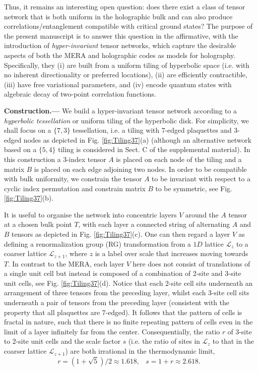\documentclass[aps,prl,twocolumn,showpacs,superscriptaddress,floatfix,10pt]{revtex4-1}
\def\L{{\mathcal L}}
\begin{document}
Thus, it remains an interesting open question: does there exist a class of tensor network that is both uniform in the holographic bulk and can also produce correlations/entanglement compatible with critical ground states? The purpose of the present manuscript is to answer this question in the affirmative, with the introduction of \emph{hyper-invariant} tensor networks, which capture the desirable aspects of both the MERA and holographic codes as models for holography. Specifically, they (i) are built from a uniform tiling of hyperbolic space (i.e. with no inherent directionality or preferred locations), (ii) are efficiently contractible, (iii) have free variational parameters, and (iv) encode quantum states with algebraic decay of two-point correlation functions. 

\textbf{Construction.---} We build a hyper-invariant tensor network according to a \emph{hyperbolic tessellation} or uniform tiling of the hyperbolic disk. For simplicity, we shall focus on a $\{7,3\}$ tessellation, i.e. a tiling with 7-edged plaquettes and 3-edged nodes as depicted in Fig. \ref{fig:Tiling37}(a) (although an alternative network based on a $\{5,4\}$ tiling is considered in Sect. C of the supplemental material). In this construction a 3-index tensor $A$ is placed on each node of the tiling and a matrix $B$ is placed on each edge adjoining two nodes. In order to be compatible with bulk uniformity, we constrain the tensor $A$ to be invariant with respect to a cyclic index permutation and constrain matrix $B$ to be symmetric, see Fig. \ref{fig:Tiling37}(b).

It is useful to organise the network into concentric layers $V$ around the $A$ tensor at a chosen bulk point $T$, with each layer a connected string of alternating $A$ and $B$ tensors as depicted in Fig. \ref{fig:Tiling37}(c). One can then regard a layer $V$ as defining a renormalization group (RG) transformation from a $1D$ lattice $\L_z$ to a coarser lattice $\L_{z+1}$, where $z$ is a label over scale that increases moving towards $T$. In contrast to the MERA, each layer $V$ here does not consist of translations of a single unit cell but instead is composed of a combination of 2-site and 3-site unit cells, see Fig. \ref{fig:Tiling37}(d). Notice that each 2-site cell sits underneath an arrangement of three tensors from the preceding layer, whilst each 3-site cell sits underneath a pair of tensors from the preceding layer (consistent with the property that all plaquettes are 7-edged). It follows that the pattern of cells is fractal in nature, such that there is no finite repeating pattern of cells even in the limit of a layer infinitely far from the center. Consequentially, the ratio $r$ of 3-site to 2-site unit cells and the scale factor $s$ (i.e. the ratio of sites in $\L_z$ to that in the coarser lattice $\L_{z+1}$) are both irrational in the thermodynamic limit,
\begin{equation}
r = (1 + \sqrt 5)/2 \approx 1.618, \; \; \; s = 1+r \approx 2.618. \label{eq:scalefactor}
\end{equation}
\end{document}

